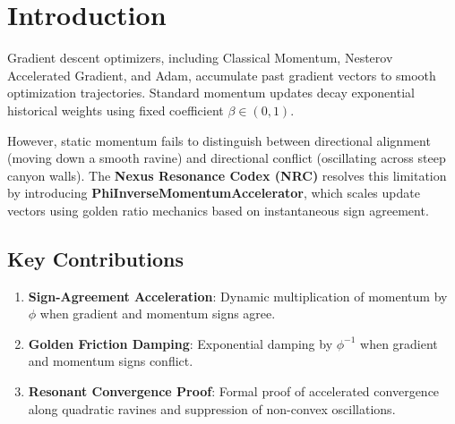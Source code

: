 \section{Introduction}
Gradient descent optimizers, including Classical Momentum, Nesterov Accelerated Gradient, and Adam, accumulate past gradient vectors to smooth optimization trajectories. Standard momentum updates decay exponential historical weights using fixed coefficient $\beta \in (0,1)$.

However, static momentum fails to distinguish between directional alignment (moving down a smooth ravine) and directional conflict (oscillating across steep canyon walls). The \textbf{Nexus Resonance Codex (NRC)} resolves this limitation by introducing \textbf{PhiInverseMomentumAccelerator}, which scales update vectors using golden ratio mechanics based on instantaneous sign agreement.

\subsection{Key Contributions}
\begin{enumerate}[label=\textbf{\arabic*.}]
    \item \textbf{Sign-Agreement Acceleration}: Dynamic multiplication of momentum by $\phi$ when gradient and momentum signs agree.
    \item \textbf{Golden Friction Damping}: Exponential damping by $\phi^{-1}$ when gradient and momentum signs conflict.
    \item \textbf{Resonant Convergence Proof}: Formal proof of accelerated convergence along quadratic ravines and suppression of non-convex oscillations.
\end{enumerate}